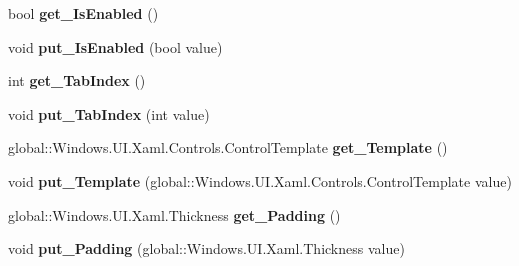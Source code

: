\begin{DoxyCompactItemize}
bool {\bfseries get\+\_\+\+Is\+Enabled} ()
\item 
\mbox{\label{interface_windows_1_1_u_i_1_1_xaml_1_1_controls_1_1_i_control_a77bf29586295b2ff15c2306dc6daf932}} 
void {\bfseries put\+\_\+\+Is\+Enabled} (bool value)
\item 
\mbox{\label{interface_windows_1_1_u_i_1_1_xaml_1_1_controls_1_1_i_control_a0849d00c16f282e234c52079d37fbd5a}} 
int {\bfseries get\+\_\+\+Tab\+Index} ()
\item 
\mbox{\label{interface_windows_1_1_u_i_1_1_xaml_1_1_controls_1_1_i_control_a18bbebda6a6cee0159bb14a9ac6ee66f}} 
void {\bfseries put\+\_\+\+Tab\+Index} (int value)
\item 
\mbox{\label{interface_windows_1_1_u_i_1_1_xaml_1_1_controls_1_1_i_control_a81ca470482b238153cd3f15d30056ed8}} 
global\+::\+Windows.\+U\+I.\+Xaml.\+Controls.\+Control\+Template {\bfseries get\+\_\+\+Template} ()
\item 
\mbox{\label{interface_windows_1_1_u_i_1_1_xaml_1_1_controls_1_1_i_control_a47a20a386ef872f62d75cd4371bdc883}} 
void {\bfseries put\+\_\+\+Template} (global\+::\+Windows.\+U\+I.\+Xaml.\+Controls.\+Control\+Template value)
\item 
\mbox{\label{interface_windows_1_1_u_i_1_1_xaml_1_1_controls_1_1_i_control_a452993e07931c19d328c465e2fbf9c1b}} 
global\+::\+Windows.\+U\+I.\+Xaml.\+Thickness {\bfseries get\+\_\+\+Padding} ()
\item 
\mbox{\label{interface_windows_1_1_u_i_1_1_xaml_1_1_controls_1_1_i_control_a0cb6fa986bebae13f4ec72989952a80f}} 
void {\bfseries put\+\_\+\+Padding} (global\+::\+Windows.\+U\+I.\+Xaml.\+Thickness value)
\item 
\mbox{\label{interface_windows_1_1_u_i_1_1_xaml_1_1_controls_1_1_i_control_ab7063d3439567f73075e2c9561509b3a}} 

\end{DoxyCompactItemize}

